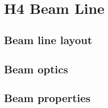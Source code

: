 \section{H4 Beam Line}
\label{sec:h4beamline}

\subsection{Beam line layout}

\subsection{Beam optics}

\subsection{Beam properties}




